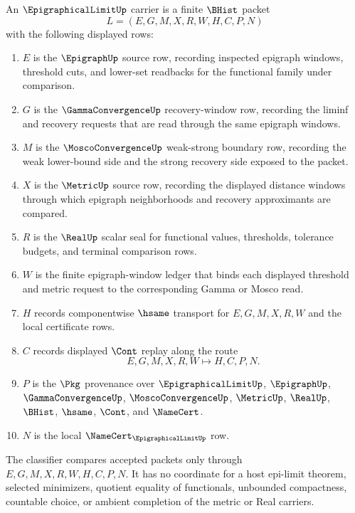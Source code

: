 \begin{definition}
\label{def:epigraphical-limit-carrier}
An $\EpigraphicalLimitUp$ carrier is a finite $\BHist$ packet
$$
L=(E,G,M,X,R,W,H,C,P,N)
$$
with the following displayed rows:
\begin{enumerate}
\item $E$ is the $\EpigraphUp$ source row, recording inspected epigraph windows, threshold cuts, and lower-set readbacks for the functional family under comparison.
\item $G$ is the $\GammaConvergenceUp$ recovery-window row, recording the liminf and recovery requests that are read through the same epigraph windows.
\item $M$ is the $\MoscoConvergenceUp$ weak-strong boundary row, recording the weak lower-bound side and the strong recovery side exposed to the packet.
\item $X$ is the $\MetricUp$ source row, recording the displayed distance windows through which epigraph neighborhoods and recovery approximants are compared.
\item $R$ is the $\RealUp$ scalar seal for functional values, thresholds, tolerance budgets, and terminal comparison rows.
\item $W$ is the finite epigraph-window ledger that binds each displayed threshold and metric request to the corresponding Gamma or Mosco read.
\item $H$ records componentwise $\hsame$ transport for $E,G,M,X,R,W$ and the local certificate rows.
\item $C$ records displayed $\Cont$ replay along the route
$$
E,G,M,X,R,W \longmapsto H,C,P,N .
$$
\item $P$ is the $\Pkg$ provenance over $\EpigraphicalLimitUp$, $\EpigraphUp$, $\GammaConvergenceUp$, $\MoscoConvergenceUp$, $\MetricUp$, $\RealUp$, $\BHist$, $\hsame$, $\Cont$, and $\NameCert$.
\item $N$ is the local $\NameCert_{\EpigraphicalLimitUp}$ row.
\end{enumerate}
The classifier compares accepted packets only through $E,G,M,X,R,W,H,C,P,N$. It has no coordinate for a host epi-limit theorem, selected minimizers, quotient equality of functionals, unbounded compactness, countable choice, or ambient completion of the metric or Real carriers.
\end{definition}

